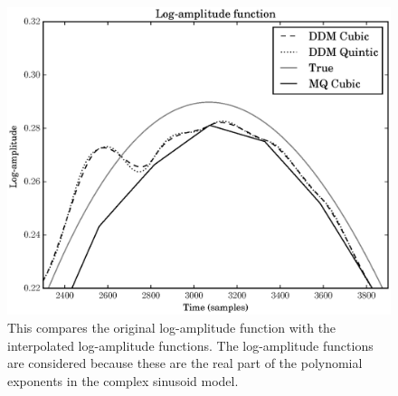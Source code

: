 \begin{figure}[!t]
    \includegraphics[width=\textwidth]{plots/mq_mod_err_comp_logamp_func.eps}
    \caption{This compares the original log-amplitude function with the
    interpolated log-amplitude functions. The log-amplitude functions are
    considered because these are the real part of the polynomial exponents in
    the complex sinusoid model.
    \label{plot:mqmoderrcomplogampfunc}}
\end{figure}

